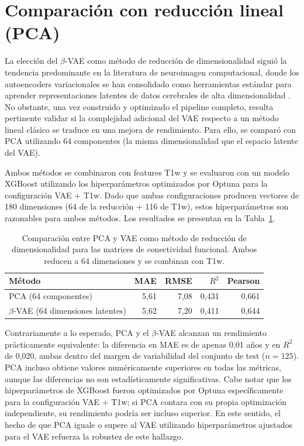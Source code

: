 \section{Comparación con reducción lineal (PCA)}
\label{sec:res_pca}

La elección del $\beta$-VAE como método de reducción de dimensionalidad siguió la tendencia predominante en la literatura de neuroimagen computacional, donde los autoencoders variacionales se han consolidado como herramientas estándar para aprender representaciones latentes de datos cerebrales de alta dimensionalidad \cite{higgins2017beta, dufumier2024multi}. No obstante, una vez construido y optimizado el pipeline completo, resulta pertinente validar si la complejidad adicional del VAE respecto a un método lineal clásico se traduce en una mejora de rendimiento. Para ello, se comparó con PCA utilizando 64 componentes (la misma dimensionalidad que el espacio latente del VAE).

Ambos métodos se combinaron con features T1w y se evaluaron con un modelo XGBoost utilizando los hiperparámetros optimizados por Optuna para la configuración VAE + T1w. Dado que ambas configuraciones producen vectores de 180 dimensiones (64 de la reducción + 116 de T1w), estos hiperparámetros son razonables para ambos métodos. Los resultados se presentan en la Tabla~\ref{tab:pca_vs_vae}.

\begin{table}[H]
\centering
\caption{Comparación entre PCA y VAE como método de reducción de dimensionalidad para las matrices de conectividad funcional. Ambos reducen a 64 dimensiones y se combinan con T1w.}
\label{tab:pca_vs_vae}
\begin{tabular}{lrrrr}
\toprule
\textbf{Método} & \textbf{MAE} & \textbf{RMSE} & \textbf{$R^2$} & \textbf{Pearson} \\
\midrule
PCA (64 componentes) & 5,61 & 7,08 & 0,431 & 0,661 \\
$\beta$-VAE (64 dimensiones latentes) & 5,62 & 7,20 & 0,411 & 0,644 \\
\bottomrule
\end{tabular}
\end{table}

Contrariamente a lo esperado, PCA y el $\beta$-VAE alcanzan un rendimiento prácticamente equivalente: la diferencia en MAE es de apenas 0,01 años y en $R^2$ de 0,020, ambas dentro del margen de variabilidad del conjunto de test ($n = 125$). PCA incluso obtiene valores numéricamente superiores en todas las métricas, aunque las diferencias no son estadísticamente significativas. Cabe notar que los hiperparámetros de XGBoost fueron optimizados por Optuna específicamente para la configuración VAE + T1w; si PCA contara con su propia optimización independiente, su rendimiento podría ser incluso superior. En este sentido, el hecho de que PCA iguale o supere al VAE utilizando hiperparámetros ajustados para el VAE refuerza la robustez de este hallazgo.

